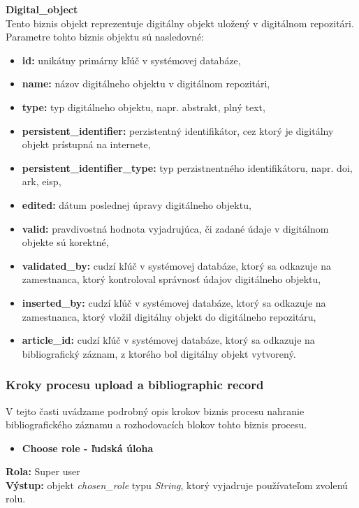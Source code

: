 \documentclass[10pt,oneside,slovak,a4paper]{article}
\begin{document}
\textbf{Digital\_object}\\
Tento biznis objekt reprezentuje digitálny objekt uložený v digitálnom repozitári. Parametre tohto biznis objektu sú nasledovné:

\begin{itemize}
\item \textbf{id:} unikátny primárny kľúč v systémovej databáze,
\item \textbf{name:} názov digitálneho objektu v digitálnom repozitári,
\item \textbf{type:} typ digitálneho objektu, napr. abstrakt, plný text,
\item \textbf{persistent\_identifier:} perzistentný identifikátor, cez ktorý je digitálny objekt prístupná na internete,
\item \textbf{persistent\_identifier\_type:} typ perzistnentného identifikátoru, napr. doi, ark, eisp,
\item \textbf{edited:} dátum poslednej úpravy digitálneho objektu,
\item \textbf{valid:} pravdivostná hodnota vyjadrujúca, či zadané údaje v digitálnom objekte sú korektné,
\item \textbf{validated\_by:} cudzí kľúč v systémovej databáze, ktorý sa odkazuje na zamestnanca, ktorý kontroloval správnosť údajov digitálneho objektu,
\item \textbf{inserted\_by:} cudzí kľúč v systémovej databáze, ktorý sa odkazuje na zamestnanca, ktorý vložil digitálny objekt do digitálneho repozitáru,
\item \textbf{article\_id:} cudzí kľúč v systémovej databáze, ktorý sa odkazuje na bibliografický záznam, z ktorého bol digitálny objekt vytvorený.
\end{itemize}

\subsubsection{Kroky procesu upload a bibliographic record}
V tejto časti uvádzame podrobný opis krokov biznis procesu nahranie bibliografického záznamu a rozhodovacích blokov tohto biznis procesu.

\begin{itemize}
\item \textbf{Choose role - ľudská úloha}
\end{itemize}

\textbf{Rola:} Super user\\
\textbf{Výstup:} objekt \textit{chosen\_role} typu \textit{String}, ktorý vyjadruje používateľom zvolenú rolu.
\end{document}
